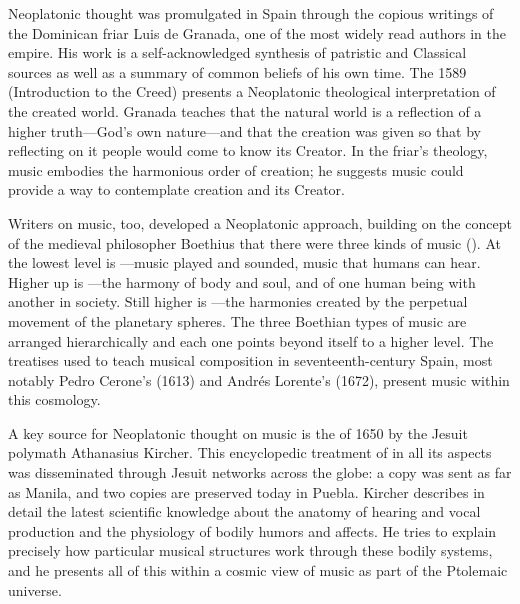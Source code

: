 Neoplatonic thought was promulgated in Spain through the copious writings of
the Dominican friar Luis de Granada, one of the most widely read authors in
the empire.%
    \Autocite{Weber:ReligiousLitSpain}
His work is a self-acknowledged synthesis of patristic and Classical
sources as well as a summary of common beliefs of his own time.
The 1589  (Introduction to the Creed)
presents a Neoplatonic theological interpretation of the created world.%
    \Autocites
    {LuisdeGranada-Balcells:SimboloPtI}
    {LuisdeGranada:Simbolo}
Granada teaches that the natural world is a reflection of a higher
truth---God's own nature---and that the creation was given so that by
reflecting on it people would come to know its Creator.%
    \Autocite[Cf.][]{Nieremberg:Sympatia}
In the friar's theology, music embodies the harmonious order of creation; he
suggests music could provide a way to contemplate creation and its
Creator.


Writers on music, too, developed a Neoplatonic approach, building on the
concept of the medieval philosopher Boethius that there were three kinds of
music ().%
    \Autocite{Boethius:Musica}
At the lowest level is ---music played and sounded,
music that humans can hear.
Higher up is ---the harmony of body and soul, and of one
human being with another in society.
Still higher is ---the harmonies created by the perpetual
movement of the planetary spheres.
The three Boethian types of music are arranged hierarchically and each one
points beyond itself to a higher level.
The treatises used to teach musical composition in seventeenth-century Spain,
most notably Pedro Cerone's  (1613) and Andrés
Lorente's  (1672), present music within this
cosmology.


A key source for Neoplatonic thought on music is the  of 1650 by the Jesuit polymath Athanasius Kircher.%
\Autocite{Kircher:Musurgia}
This encyclopedic treatment of  in all its aspects
was disseminated through Jesuit networks across the globe: a copy was sent as
far as Manila, and two copies are preserved today in Puebla.%
    \Autocites
    {Findlen:Kircher}
    {Godwin:KircherTheater}
    [48--50]{Irving:Colonial}
Kircher describes in detail the latest scientific knowledge about the anatomy
of hearing and vocal production and the physiology of bodily humors and
affects. 
He tries to explain precisely how particular musical structures
work through these bodily systems, and he presents all of this within a cosmic
view of music as part of the Ptolemaic universe.

